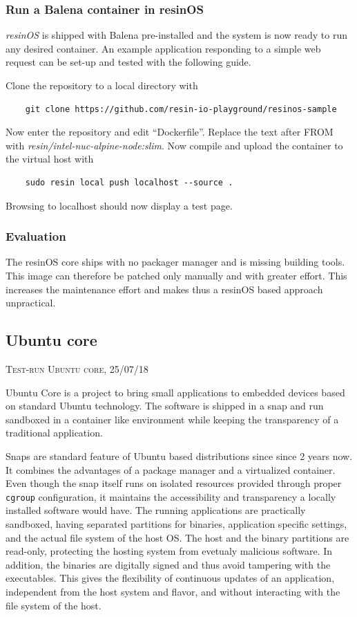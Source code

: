 \documentclass[]{scrartcl}
\begin{document}
\subsubsection{Run a Balena container in resinOS}

\textit{resinOS} is shipped with Balena pre-installed and the system is now ready to run any desired container. 
An example application responding to a simple web request can be set-up and tested with the following guide.

Clone the repository to a local directory with
\begin{verbatim}
	git clone https://github.com/resin-io-playground/resinos-sample
\end{verbatim}

Now enter the repository and edit ``Dockerfile''. Replace the text after FROM with \textit{resin/intel-nuc-alpine-node:slim}. Now compile and upload the container to the virtual host with

\begin{verbatim}
	sudo resin local push localhost --source .
\end{verbatim}

Browsing to localhost should now display a test page.

\subsubsection{Evaluation}

The resinOS core ships with no packager manager and is missing building tools. This image can therefore be patched only manually and with greater effort. This increases the maintenance effort and makes thus a resinOS based approach unpractical.

\subsection{Ubuntu core}
{\small\textsc{Test-run Ubuntu core, 25/07/18} \bigskip}

Ubuntu Core is a project to bring small applications to embedded devices based on standard Ubuntu technology. The software is shipped in a snap and run sandboxed in a container like environment while keeping the transparency of a traditional application. 

Snaps are standard feature of Ubuntu based distributions since since 2 years now. It combines the advantages of a package manager and a virtualized container. Even though the snap itself runs on isolated resources provided through proper \texttt{cgroup} configuration, it maintains the accessibility and transparency a locally installed software would have. The running applications are practically sandboxed, having separated partitions for binaries, application specific settings, and the actual file system of the host OS. The host and the binary partitions are read-only, protecting the hosting system from evetualy malicious software. In addition, the binaries are digitally signed and thus avoid tampering with the executables. This gives the flexibility of continuous updates of an application, independent from the host system and flavor, and without interacting with the file system of the host.
\end{document}

